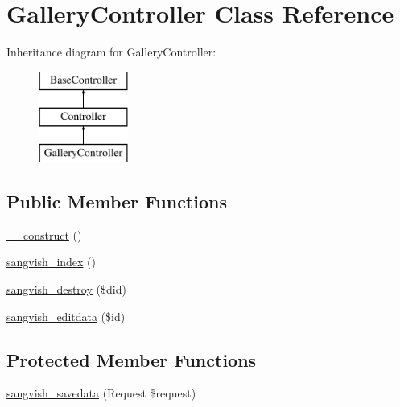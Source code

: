 \hypertarget{class_responsive_1_1_http_1_1_controllers_1_1_gallery_controller}{}\section{Gallery\+Controller Class Reference}
\label{class_responsive_1_1_http_1_1_controllers_1_1_gallery_controller}
Inheritance diagram for Gallery\+Controller\+:\begin{figure}[H]
\begin{center}
\leavevmode
\includegraphics[height=3.000000cm]{class_responsive_1_1_http_1_1_controllers_1_1_gallery_controller}
\end{center}
\end{figure}
\subsection*{Public Member Functions}
\begin{DoxyCompactItemize}
\item 
\mbox{\hyperlink{class_responsive_1_1_http_1_1_controllers_1_1_gallery_controller_a095c5d389db211932136b53f25f39685}{\+\_\+\+\_\+construct}} ()
\item 
\mbox{\hyperlink{class_responsive_1_1_http_1_1_controllers_1_1_gallery_controller_a102ddc90c5f30fa7831dcf999b905ad1}{sangvish\+\_\+index}} ()
\item 
\mbox{\hyperlink{class_responsive_1_1_http_1_1_controllers_1_1_gallery_controller_a4ef7021a71a781742edf692230b3626b}{sangvish\+\_\+destroy}} (\$did)
\item 
\mbox{\hyperlink{class_responsive_1_1_http_1_1_controllers_1_1_gallery_controller_a630f91fa525b55af595df8a2fbf882d4}{sangvish\+\_\+editdata}} (\$id)
\end{DoxyCompactItemize}
\subsection*{Protected Member Functions}
\begin{DoxyCompactItemize}
\item 
\mbox{\hyperlink{class_responsive_1_1_http_1_1_controllers_1_1_gallery_controller_a63d8d498a130e9f530dd9de0247a0c74}{sangvish\+\_\+savedata}} (Request \$request)
\end{DoxyCompactItemize}


